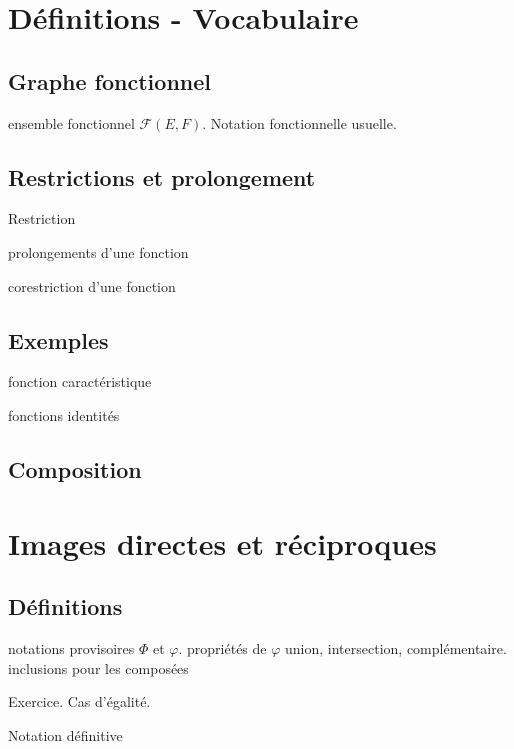 


\section{Définitions - Vocabulaire}

\subsection{Graphe fonctionnel}
ensemble fonctionnel $\mathcal F(E,F)$.
\newline
Notation fonctionnelle usuelle.

\subsection{Restrictions et prolongement}
 Restriction

prolongements d'une fonction

corestriction d'une fonction

\subsection{Exemples}
fonction caractéristique

fonctions identités

\subsection{Composition}

\section{Images directes et réciproques}
\subsection{Définitions}
notations provisoires $\Phi$ et $\varphi$.
propriétés de $\varphi$ union, intersection, complémentaire.
inclusions pour les composées

Exercice. Cas d'égalité.

Notation définitive

